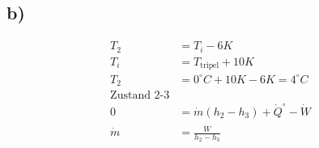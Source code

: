

\subsection*{b)}

\begin{align*}
T_2 &= T_i - 6K \\
T_i &= T_{\text{tripel}} + 10K \\
T_2 &= 0^\circ C + 10K - 6K = 4^\circ C \\
\text{Zustand 2-3} \\
0 &= \dot{m} (h_2 - h_3) + \dot{Q}^{\circ} - \dot{W} \\
\dot{m} &= \frac{\dot{W}}{h_2 - h_3}
\end{align*}